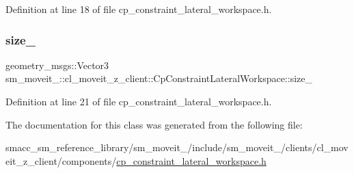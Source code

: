 Definition at line 18 of file cp\+\_\+constraint\+\_\+lateral\+\_\+workspace.\+h.

\mbox{\label{classsm__moveit__4_1_1cl__moveit__z__client_1_1CpConstraintLateralWorkspace_a35fb6ec0933eff1c2e4a7930b9815fcb}} 
\subsubsection{\texorpdfstring{size\+\_\+}{size\_}}
{\footnotesize\ttfamily geometry\+\_\+msgs\+::\+Vector3 sm\+\_\+moveit\+\_\+::cl\+\_\+moveit\+\_\+z\+\_\+client\+::\+Cp\+Constraint\+Lateral\+Workspace\+::size\+\_\+\hspace{0.3cm}{\ttfamily [private]}}



Definition at line 21 of file cp\+\_\+constraint\+\_\+lateral\+\_\+workspace.\+h.



The documentation for this class was generated from the following file\+:\begin{DoxyCompactItemize}
\item 
smacc\+\_\+sm\+\_\+reference\+\_\+library/sm\+\_\+moveit\+\_/include/sm\+\_\+moveit\+\_/clients/cl\+\_\+moveit\+\_\+z\+\_\+client/components/\hyperlink{cp__constraint__lateral__workspace_8h}{cp\+\_\+constraint\+\_\+lateral\+\_\+workspace.\+h}\end{DoxyCompactItemize}
